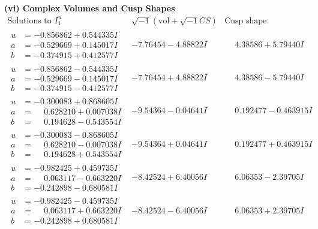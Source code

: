 \documentclass[1p]{elsarticle_modified}
\theoremstyle{definition}
\newcommand{\I}{\sqrt{-1}}
\begin{document}
\newpage\flushleft \textbf{(vi) Complex Volumes and Cusp Shapes}
$$\begin{array}{c|c|c}  
\text{Solutions to }I^u_{1}& \I (\text{vol} + \sqrt{-1}CS) & \text{Cusp shape}\\
 \hline 
\begin{aligned}
u &= -0.856862 + 0.544335 I \\
a &= -0.529669 + 0.145017 I \\
b &= -0.374915 + 0.412577 I\end{aligned}
 & -7.76454 - 4.88822 I & \phantom{-}4.38586 + 5.79440 I \\ \hline\begin{aligned}
u &= -0.856862 - 0.544335 I \\
a &= -0.529669 - 0.145017 I \\
b &= -0.374915 - 0.412577 I\end{aligned}
 & -7.76454 + 4.88822 I & \phantom{-}4.38586 - 5.79440 I \\ \hline\begin{aligned}
u &= -0.300083 + 0.868605 I \\
a &= \phantom{-}0.628210 + 0.007038 I \\
b &= \phantom{-}0.194628 - 0.543554 I\end{aligned}
 & -9.54364 - 0.04641 I & \phantom{-}0.192477 - 0.463915 I \\ \hline\begin{aligned}
u &= -0.300083 - 0.868605 I \\
a &= \phantom{-}0.628210 - 0.007038 I \\
b &= \phantom{-}0.194628 + 0.543554 I\end{aligned}
 & -9.54364 + 0.04641 I & \phantom{-}0.192477 + 0.463915 I \\ \hline\begin{aligned}
u &= -0.982425 + 0.459735 I \\
a &= \phantom{-}0.063117 - 0.663220 I \\
b &= -0.242898 - 0.680581 I\end{aligned}
 & -8.42524 + 6.40056 I & \phantom{-}6.06353 - 2.39705 I \\ \hline\begin{aligned}
u &= -0.982425 - 0.459735 I \\
a &= \phantom{-}0.063117 + 0.663220 I \\
b &= -0.242898 + 0.680581 I\end{aligned}
 & -8.42524 - 6.40056 I & \phantom{-}6.06353 + 2.39705 I \\ \hline\begin{aligned}

\end{aligned}
\end{array}$$
\end{document}
